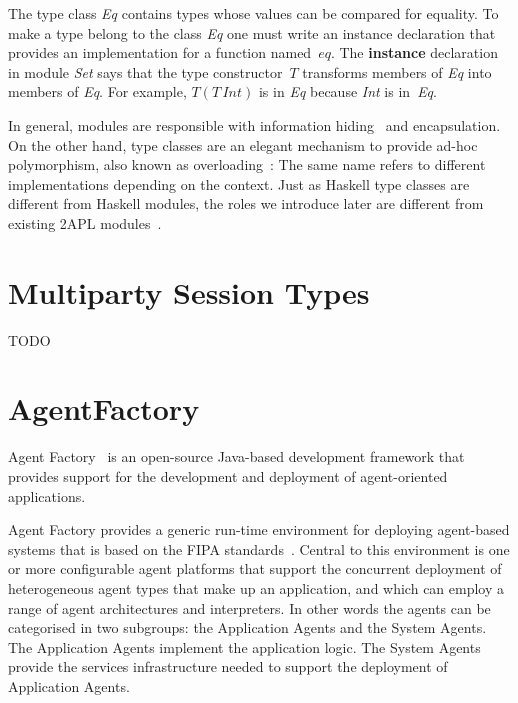 \documentclass[a4paper,12pt,oneside,fleqn]{book} %
\theoremstyle{plain}
\theoremstyle{definition}
\theoremstyle{remark}
\begin{document}

The type class \textit{Eq} contains types whose values can be compared for
equality. To make a type belong to the class \textit{Eq} one must write an
instance declaration that provides an implementation for a function
named~$eq$. The \textbf{instance} declaration in module \textit{Set} says
that the type constructor~$T$ transforms members of \textit{Eq} into
members of \textit{Eq}. For example, $T(T\,\mathit{Int})$ is in \textit{Eq}
because \textit{Int} is in~\textit{Eq}.

In general, modules are responsible with information
hiding~\cite{DBLP:journals/cacm/Parnas72a} and encapsulation.  On the other
hand, type classes are an elegant mechanism to provide ad-hoc polymorphism,
also known as overloading~\cite{DBLP:conf/popl/WadlerB89}: The same name
refers to different implementations depending on the context.  Just as
Haskell type classes are different from Haskell modules, the roles we
introduce later are different from existing 2APL
modules~\cite{dblp:conf/prima/dastanims08}.


\section{Multiparty Session Types} %

TODO

\section{AgentFactory} %

Agent Factory~\cite{collier2002agent} is an open-source Java-based
development framework that provides support for the development and
deployment of agent-oriented applications.

Agent Factory provides a generic run-time environment for deploying
agent-based systems that is based on the FIPA
standards~\cite{poslad2000fipa}.  Central to this environment is one or
more configurable agent platforms that support the concurrent deployment of
heterogeneous agent types that make up an application, and which can employ
a range of agent architectures and interpreters. In other words the agents
can be categorised in two subgroups: the Application Agents and the System
Agents. The Application Agents implement the application logic. The System
Agents provide the services infrastructure needed to support the deployment
of Application Agents. 
\end{document}
